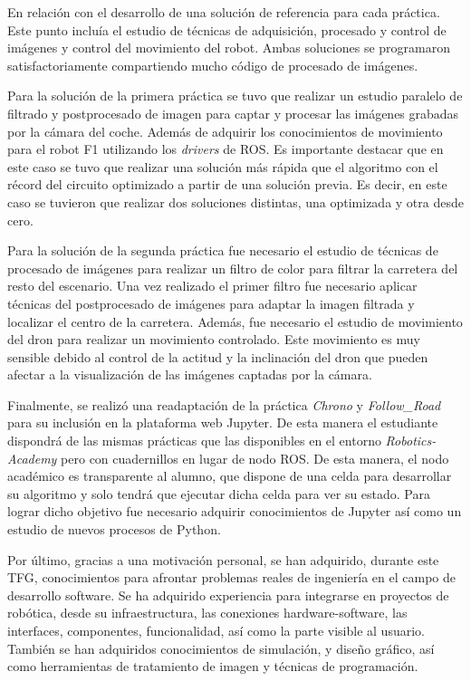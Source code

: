 En relación con el desarrollo de una solución de referencia para cada práctica. Este punto incluía el estudio de técnicas de adquisición, procesado y control de imágenes y control del movimiento del robot. Ambas soluciones se programaron satisfactoriamente compartiendo mucho código de procesado de imágenes.

Para la solución de la primera práctica se tuvo que realizar un estudio paralelo de filtrado y postprocesado de imagen para captar y procesar las imágenes grabadas por la cámara del coche. Además de adquirir los conocimientos de movimiento para el robot F1 utilizando los \textit{drivers} de ROS. Es importante destacar que en este caso se tuvo que realizar una solución más rápida que el algoritmo con el récord del circuito optimizado a partir de una solución previa. Es decir, en este caso se tuvieron que realizar dos soluciones distintas, una optimizada y otra desde cero.

Para la solución de la segunda práctica fue necesario el estudio de técnicas de procesado de imágenes para realizar un filtro de color para filtrar la carretera del resto del escenario. Una vez realizado el primer filtro fue necesario aplicar técnicas del postprocesado de imágenes para adaptar la imagen filtrada y localizar el centro de la carretera. Además, fue necesario el estudio de movimiento del dron para realizar un movimiento controlado. Este movimiento es muy sensible debido al control de la actitud y la inclinación del dron que pueden afectar a la visualización de las imágenes captadas por la cámara.

Finalmente, se realizó una readaptación de la práctica \textit{Chrono} y \textit{Follow\_Road} para su inclusión en la plataforma web Jupyter. De esta manera el estudiante dispondrá de las mismas prácticas que las disponibles en el entorno \textit{Robotics-Academy} pero con cuadernillos en lugar de nodo ROS. De esta manera, el nodo académico es transparente al alumno, que dispone de una celda para desarrollar su algoritmo y solo tendrá que ejecutar dicha celda para ver su estado.
Para lograr dicho objetivo fue necesario adquirir conocimientos de Jupyter así como un estudio de nuevos procesos de Python.

Por último, gracias a una motivación personal, se han adquirido, durante este TFG, conocimientos para afrontar problemas reales de ingeniería en el campo de desarrollo software. Se ha adquirido experiencia para integrarse en proyectos de robótica, desde su infraestructura, las conexiones hardware-software, las interfaces, componentes, funcionalidad, así como la parte visible al usuario. También se han adquiridos conocimientos de simulación, y diseño gráfico, así como herramientas de tratamiento de imagen y técnicas de programación.

